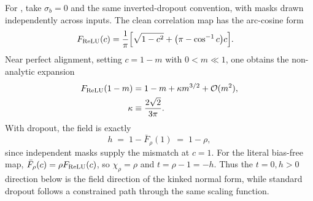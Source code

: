 For \relu{}, take \(\sigma_b=0\) and the same inverted-dropout convention, with masks drawn independently across inputs. The clean correlation map has the arc-cosine form \cite{ChoSaul2009ArcCosine}
\begin{align}
F_{\operatorname{ReLU}}(c) &= \frac{1}{\pi} \Bigl[ \sqrt{1-c^{2}} + \bigl(\pi-\cos^{-1}c\bigr)c \Bigr].
\label{eq:relu_map_rho1}
\end{align}
Near perfect alignment, setting \(c=1-m\) with \(0<m\ll 1\), one obtains the non-analytic expansion
\begin{align}
F_{\operatorname{ReLU}}(1-m) &= 1-m+\kappa m^{3/2}+{\cal O}(m^{2}),
\label{eq:relu_expand}\\
\kappa &\equiv \frac{2\sqrt{2}}{3\pi}. \nonumber
\end{align}
With dropout, the field is exactly
\begin{equation}
h \;=\; 1-\bar F_\rho(1) \;=\; 1-\rho,
\label{eq:relu_h_correct}
\end{equation}
since independent masks supply the mismatch at \(c=1\). For the literal bias-free \relu{} map, \(\bar F_\rho(c)=\rho F_{\operatorname{ReLU}}(c)\), so \(\chi_\rho=\rho\) and \(t=\rho-1=-h\). Thus the \(t=0,h>0\) direction below is the field direction of the kinked normal form, while standard \relu{} dropout follows a constrained path through the same scaling function.

